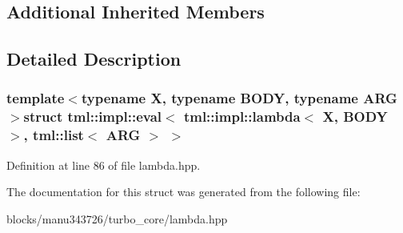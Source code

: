 \subsection*{Additional Inherited Members}


\subsection{Detailed Description}
\subsubsection*{template$<$typename X, typename B\+O\+D\+Y, typename A\+R\+G$>$struct tml\+::impl\+::eval$<$ tml\+::impl\+::lambda$<$ X, B\+O\+D\+Y $>$, tml\+::list$<$ A\+R\+G $>$ $>$}



Definition at line 86 of file lambda.\+hpp.



The documentation for this struct was generated from the following file\+:\begin{DoxyCompactItemize}
\item 
blocks/manu343726/turbo\+\_\+core/lambda.\+hpp\end{DoxyCompactItemize}
